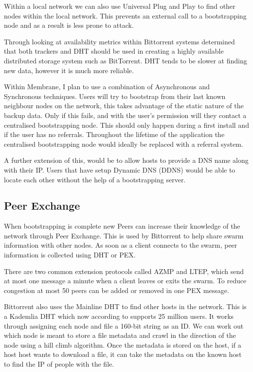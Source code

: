 \documentclass[a4paper,11pt, twocolumn]{report}
\begin{document}
Within a local network we can also use Universal Plug and Play to find other nodes within the local network. This prevents an external call to a bootstrapping node and as a result is less prone to attack.

Through looking at availability metrics within Bittorrent systems \cite{neglia2007availability} determined that both trackers and DHT should be used in creating a highly available distributed storage system such as BitTorrent. DHT tends to be slower at finding new data, however it is much more reliable.

Within Membrane, I plan to use a combination of Asynchronous and Synchronous techniques. Users will try to bootstrap from their last known neighbour nodes on the network, this takes advantage of the static nature of the backup data. Only if this fails, and with the user's permission will they contact a centralised bootstrapping node. This should only happen during a first install and if the user has no referrals. Throughout the lifetime of the application the centralised bootstrapping node would ideally be replaced with a referral system.

A further extension of this, would be to allow hosts to provide a DNS name along with their IP. Users that have setup Dynamic DNS (DDNS) \citep{bound1997dynamic} would be able to locate each other without the help of a bootstrapping server.

\subsection{Peer Exchange}

When bootstrapping is complete new Peers can increase their knowledge of the network through Peer Exchange. This is used by Bittorrent to help share swarm information with other nodes. As soon as a client connects to the swarm, peer information is collected using DHT or PEX.

There are two common extension protocols called AZMP and LTEP, which send at most one message a minute when a client leaves or exits the swarm. To reduce congestion at most 50 peers can be added or removed in one PEX message. \citep{vuze2010vuze}

Bittorrent also uses the Mainline DHT to find other hosts in the network. This is a Kademlia DHT which now according to \cite{jones2015mainlinedht} supports 25 million users. It works through assigning each node and file a 160-bit string as an ID. We can work out which node is meant to store a file metadata and crawl in the direction of the node using a hill climb algorithm. Once the metadata is stored on the host, if a host host wants to download a file, it can take the metadata on the known host to find the IP of people with the file.
\end{document}
